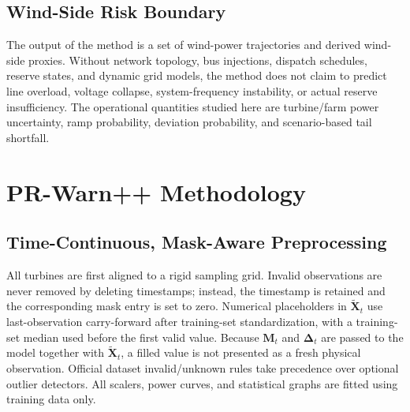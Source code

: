 \documentclass[journal]{IEEEtran}
\newcommand{\1}{\mathbb{I}}
\begin{document}
\subsection{Wind-Side Risk Boundary}
The output of the method is a set of wind-power trajectories and derived wind-side proxies. Without network topology, bus injections, dispatch schedules, reserve states, and dynamic grid models, the method does not claim to predict line overload, voltage collapse, system-frequency instability, or actual reserve insufficiency. The operational quantities studied here are turbine/farm power uncertainty, ramp probability, deviation probability, and scenario-based tail shortfall.

\section{PR-Warn++ Methodology}
\subsection{Time-Continuous, Mask-Aware Preprocessing}
All turbines are first aligned to a rigid sampling grid. Invalid observations are never removed by deleting timestamps; instead, the timestamp is retained and the corresponding mask entry is set to zero. Numerical placeholders in $\tilde{\bm X}_t$ use last-observation carry-forward after training-set standardization, with a training-set median used before the first valid value. Because $\bm M_t$ and $\bm\Delta_t$ are passed to the model together with $\tilde{\bm X}_t$, a filled value is not presented as a fresh physical observation. Official dataset invalid/unknown rules take precedence over optional outlier detectors. All scalers, power curves, and statistical graphs are fitted using training data only.
\end{document}
